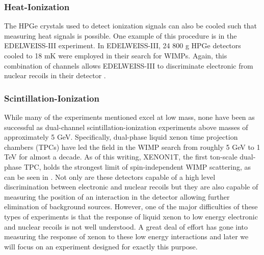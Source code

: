 \subsubsection{Heat-Ionization}

The HPGe crystals used to detect ionization signals can also be cooled such that measuring heat signals is possible.  One example of this procedure is in the EDELWEISS-III experiment.  In EDELWEISS-III, 24 800 g HPGe detectors cooled to 18 mK were employed in their search for WIMPs. Again, this combination of channels allows EDELWEISS-III to discriminate electronic from nuclear recoils in their detector \cite{armengaud2016constraints}.

\subsubsection{Scintillation-Ionization}

While many of the experiments mentioned excel at low mass, none have been as successful as dual-channel scintillation-ionization experiments above masses of approximately 5 GeV.  Specifically, dual-phase liquid xenon time projection chambers (TPCs) have led the field in the WIMP search from roughly 5 GeV to 1 TeV for almost a decade.  As of this writing, XENON1T, the first ton-scale dual-phase TPC, holds the strongest limit of spin-independent WIMP scattering, as can be seen in  \cite{aprile2017first, collaboration2017dark}.  Not only are these detectors capable of a high level discrimination between electronic and nuclear recoils but they are also capable of measuring the position of an interaction in the detector allowing further elimination of background sources.  However, one of the major difficulties of these types of experiments is that the response of liquid xenon to low energy electronic and nuclear recoils is not well understood.  A great deal of effort has gone into measuring the response of xenon to these low energy interactions and later we will focus on an experiment designed for exactly this purpose.

